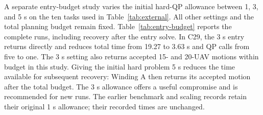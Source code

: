 A separate entry-budget study varies the initial hard-QP allowance between 1, 3, and 5 s on the ten tasks used in Table~\ref{tab:external}. All other settings and the total planning budget remain fixed. Table~\ref{tab:entry-budget} reports the complete runs, including recovery after the entry solve. In C29, the 3 s entry returns directly and reduces total time from 19.27 to 3.63 s and QP calls from five to one. The 3 s setting also returns accepted 15- and 20-UAV motions within budget in this study. Giving the initial hard problem 5 s reduces the time available for subsequent recovery: Winding A then returns its accepted motion after the total budget. The 3 s allowance offers a useful compromise and is recommended for new runs. The earlier benchmark and scaling records retain their original 1 s allowance; their recorded times are unchanged.

